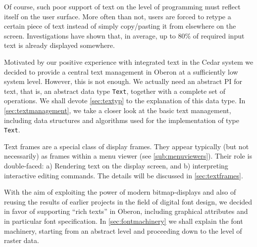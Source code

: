 Of course,
such poor support of text on the level of programming must reflect itself on the user surface.
More often than not, users are forced to retype a certain piece of text
instead of simply copy/pasting it from elsewhere on the screen.
Investigations have shown that, in average,
up to 80\% of required input text is already displayed somewhere.

Motivated by our positive experience with integrated text in the Cedar system \cite{Teitelman}
we decided to provide a central text management in Oberon at a sufficiently low system level.
However, this is not enough.  We actually need an abstract PI for text, that is,
an abstract data type \verb|Text|, together with a complete set of operations.
We shall devote \ref{sec:textyp} to the explanation of this data type.
In \ref{sec:textmanagement}, we take a closer look at the basic text management,
including data structures and algorithms used for the implementation of type \verb|Text|.

Text frames are a special class of display frames.  They appear typically (but not necessarily)
as frames within a menu viewer (see \ref{sub:menuviewers}).  Their role is double-faced:
a) Rendering text on the display screen, and
b) interpreting interactive editing commands.
The details will be discussed in \ref{sec:textframes}.

With the aim of exploiting the power of modern bitmap-displays
and also of reusing the results of earlier projects in the field of digital font design,
we decided in favor of supporting “rich texts” in Oberon, including graphical attributes
and in particular font specification.  In \ref{sec:fontmachinery} we shall explain the font machinery,
starting from an abstract level and proceeding down to the level of raster data.
